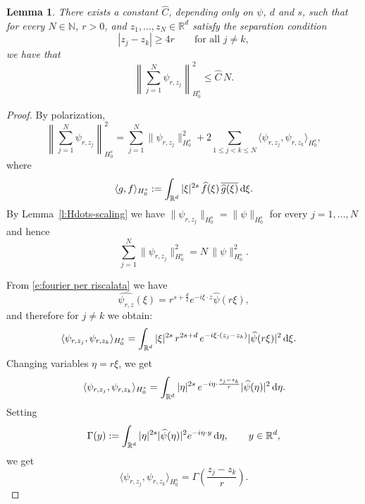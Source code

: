 \documentclass[12pt,a4paper,oneside]{amsart}
\theoremstyle{plain}
\newtheorem{lemma}[theorem]{Lemma}
\theoremstyle{definition}
\numberwithin{equation}{section}
\numberwithin{figure}{section}
\numberwithin{table}{section}
\theoremstyle{remark}
\newcommand{\R}{\mathbb{R}}
\newcommand{\dd}{\textup{d}}
\newcommand{\N}{\mathbb{N}}
\newcommand{\Fhat}[1]{\widehat{#1}}
\begin{document}
\begin{lemma}\label{l:almost-orth}
There exists a constant $\Fhat{C}$, depending only on $\psi$, $d$ and $s$, such that for every $N\in \N$, $r>0$, and $z_1,\dots,z_N\in\R^d$ satisfy the separation condition
\begin{equation}\label{e:separation}
|z_j-z_k|\ge 4r\qquad\text{for all }j\neq k,
\end{equation}
we have that
\begin{equation}\label{eq:almost-orth-bound}
\left\|\sum_{j=1}^N \psi_{r,z_j}\right\|_{H_0^s}^2 \le \Fhat{C}\,N.
\end{equation}
\end{lemma}

\begin{proof}
By polarization,
\begin{equation}\label{e:pitagora}
\left\|\sum_{j=1}^N \psi_{r,z_j}\right\|_{H_0^s}^2
=
\sum_{j=1}^N \|\psi_{r,z_j}\|_{H_0^s}^2
+
2\sum_{1\le j<k\le N}
\langle \psi_{r,z_j},\psi_{r,z_k}\rangle_{H_0^s},  \end{equation}
where
\begin{equation*}
\langle g,f\rangle_{H_0^s}
:=
\int_{\R^d} |\xi|^{2s}\,\widehat f(\xi)\,\overline{\widehat g(\xi)}\,\dd\xi.
\end{equation*}
By Lemma~\ref{l:Hdots-scaling} we have $\|\psi_{r,z_j}\|_{H_0^s}=\|\psi\|_{H_0^s}$  for every $j=1,\dots,N$ and hence
\begin{equation*}
    \sum_{j=1}^N \|\psi_{r,z_j}\|_{H_0^s}^2
=
N\,\|\psi\|_{H_0^s}^2.
\end{equation*}

From \eqref{e:fourier per riscalata} we have
\begin{equation*}
\widehat{\psi_{r,z}}(\xi)
=
r^{s+\frac d2} e^{-i\xi\cdot z}\widehat\psi(r\xi),    
\end{equation*}
and therefore for $j\neq k$ we obtain:
\begin{align*}
\langle \psi_{r,z_j},\psi_{r,z_k}\rangle_{H_0^s}
&=
\int_{\R^d}
|\xi|^{2s}\,
r^{2s+d}\,
e^{-i\xi\cdot(z_j-z_k)}
|\widehat\psi(r\xi)|^2\,\dd\xi.
\end{align*}
Changing variables $\eta=r\xi$, we get
\begin{equation*}
\langle \psi_{r,z_j},\psi_{r,z_k}\rangle_{H_0^s}
=
\int_{\R^d}
|\eta|^{2s}\,
e^{-i\eta\cdot \frac{z_j-z_k}{r}}
|\widehat\psi(\eta)|^2\,\dd\eta.    
\end{equation*}
Setting
\begin{equation}\label{eq:Gamma-def}
\Gamma(y)
:=
\int_{\R^d}
|\eta|^{2s}|\widehat\psi(\eta)|^2 e^{-i\eta\cdot y}\,\dd\eta,
\qquad y\in\R^d,
\end{equation}
we get
\begin{equation}\label{eq:cross-term-Gamma}
\langle \psi_{r,z_j},\psi_{r,z_k}\rangle_{H_0^s}
=
\Gamma \left(\frac{z_j-z_k}{r}\right).
\end{equation}


\end{proof}
\end{document}
